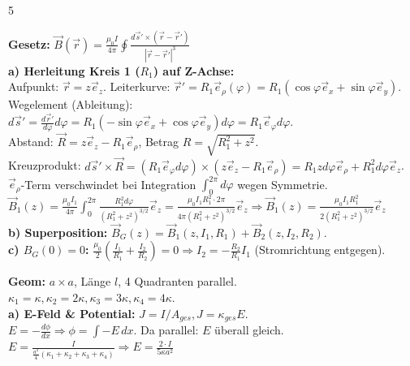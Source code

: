 \documentclass[a4paper, 2pt, landscape]{extarticle}
\begin{document}
\begin{multicols*}{5}
\begin{tcolorbox}[title={A3: Biot-Savart}, colback=col3, colframe=boxtitle]
\textbf{Gesetz:} $\vec{B}(\vec{r}) = \frac{\mu_0 I}{4\pi} \oint \frac{d\vec{s}' \times (\vec{r}-\vec{r}')}{|\vec{r}-\vec{r}'|^3}$ \\
\textbf{a) Herleitung Kreis 1 ($R_1$) auf Z-Achse:} \\
Aufpunkt: $\vec{r} = z \vec{e}_z$. Leiterkurve: $\vec{r}' = R_1 \vec{e}_\rho(\varphi) = R_1(\cos\varphi \vec{e}_x + \sin\varphi \vec{e}_y)$. \\
Wegelement (Ableitung): $d\vec{s}' = \frac{d\vec{r}'}{d\varphi} d\varphi = R_1(-\sin\varphi \vec{e}_x + \cos\varphi \vec{e}_y) d\varphi = R_1 \vec{e}_\varphi d\varphi$. \\
Abstand: $\vec{R} = z \vec{e}_z - R_1 \vec{e}_\rho$, Betrag $R = \sqrt{R_1^2+z^2}$. \\
Kreuzprodukt: $d\vec{s}' \times \vec{R} = (R_1 \vec{e}_\varphi d\varphi) \times (z \vec{e}_z - R_1 \vec{e}_\rho) = R_1 z d\varphi \vec{e}_\rho + R_1^2 d\varphi \vec{e}_z$. \\
$\vec{e}_\rho$-Term verschwindet bei Integration $\int_0^{2\pi} d\varphi$ wegen Symmetrie. \\
$\vec{B}_1(z) = \frac{\mu_0 I_1}{4\pi} \int_0^{2\pi} \frac{R_1^2 d\varphi}{(R_1^2+z^2)^{3/2}} \vec{e}_z = \frac{\mu_0 I_1 R_1^2 \cdot 2\pi}{4\pi (R_1^2+z^2)^{3/2}} \vec{e}_z \Rightarrow \boxed{\vec{B}_1(z) = \frac{\mu_0 I_1 R_1^2}{2(R_1^2+z^2)^{3/2}} \vec{e}_z}$ \\
\textbf{b) Superposition:} $\vec{B}_G(z) = \vec{B}_1(z, I_1, R_1) + \vec{B}_2(z, I_2, R_2)$. \\
\textbf{c) $B_G(0)=0$:} $\frac{\mu_0}{2} (\frac{I_1}{R_1} + \frac{I_2}{R_2}) = 0 \Rightarrow \boxed{I_2 = -\frac{R_2}{R_1} I_1}$ (Stromrichtung entgegen).
\end{tcolorbox}
\begin{tcolorbox}[title={A4: Geschichtet}, colback=col4, colframe=boxtitle]
\textbf{Geom:} $a \times a$, Länge $l$, 4 Quadranten parallel. \\
$\kappa_1=\kappa, \kappa_2=2\kappa, \kappa_3=3\kappa, \kappa_4=4\kappa$. \\
\textbf{a) E-Feld \& Potential:} $J = I/A_{ges}, J = \kappa_{ges} E$. \\
$E = -\frac{d\phi}{dx} \Rightarrow \phi = \int -E \,dx$. Da parallel: $E$ überall gleich. \\
$E = \frac{I}{\frac{a^2}{4}(\kappa_1 + \kappa_2 + \kappa_3 + \kappa_4)} \Rightarrow E = \frac{2 \cdot I}{5\kappa a^2}$ 

\end{tcolorbox}
\end{multicols*}
\end{document}
